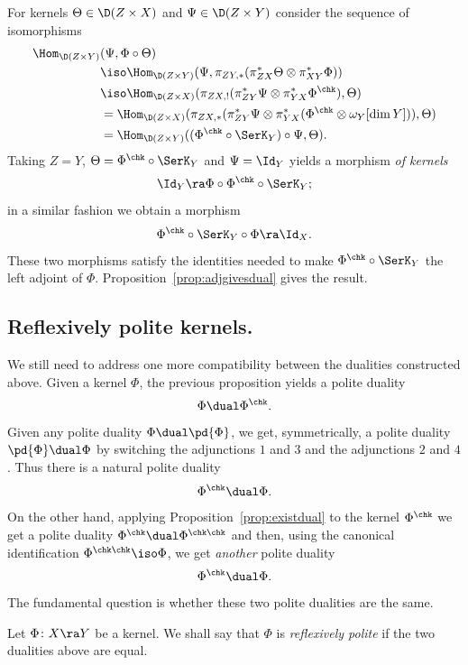 \begin{Proof}
For kernels $\Theta \in \D(Z\times X)$ and $\Psi\in \D(Z\times Y)$
consider the sequence of isomorphisms
\begin{align*}
\Hom_{\D(Z\times Y)} & (\Psi, \Phi \circ \Theta) \\*
  & \iso \Hom_{\D(Z\times Y)}(\Psi, \pi_{ZY, *}
      (\pi_{ZX}^* \Theta \otimes \pi_{XY}^* \Phi)) \\
  & \iso \Hom_{\D(Z\times X)}(\pi_{ZX,!}
    (\pi_{ZY}^* \Psi \otimes \pi_{YX}^* \Phi^\chk), \Theta) \\
  & = \Hom_{\D(Z\times X)}(\pi_{ZX, *}
      (\pi_{ZY}^*\Psi \otimes \pi_{YX}^*
        (\Phi^\chk \otimes \omega_Y[\dim Y])), \Theta) \\
  & = \Hom_{\D(Z\times Y)}((\Phi^\chk\circ \SerK_Y)\circ\Psi, \Theta).
\end{align*}
Taking $Z = Y$, $\Theta = \Phi^\chk \circ \SerK_Y$ and $\Psi=\Id_Y$
yields a morphism {\em of kernels}
\[ \Id_Y \ra \Phi \circ \Phi^\chk\circ \SerK_Y; \]
in a similar fashion we obtain a morphism
\[ \Phi^\chk \circ \SerK_Y \circ \Phi \ra \Id_X. \]
These two morphisms satisfy the identities needed to make $\Phi^\chk
\circ \SerK_Y$ the left adjoint of $\Phi$.
Proposition~\ref{prop:adjgivesdual} gives the result.
\end{Proof}

 \subsection{Reflexively polite kernels.}
We still need to address one more compatibility between the dualities
constructed above.  Given a kernel $\Phi$, the previous proposition
yields a polite duality
\[ \Phi \dual \Phi^\chk. \]
Given any polite duality $\Phi\dual \pd{\Phi}$, we get, symmetrically, a polite
duality $\pd{\Phi}
\dual \Phi$ by switching the adjunctions $1$ and  $3$ and the adjunctions
$2$ and $4$.  Thus there is a natural polite duality
\[ \Phi^\chk \dual \Phi. \]
On the other hand, applying Proposition~\ref{prop:existdual} to the
kernel $\Phi^\chk$ we get a polite duality
\( \Phi^\chk \dual \Phi^{\chk\chk}\)
and then, using the canonical identification $\Phi^{\chk\chk} \iso
\Phi$, we get {\em another} polite duality
\[ \Phi^\chk \dual \Phi.\]
The fundamental question is whether these two polite dualities are the same.

\begin{Definition}
  Let $\Phi\colon X\ra Y$ be a kernel.  We shall say that $\Phi$ is
  \emph{reflexively polite} if the two dualities above are equal.
\end{Definition}

